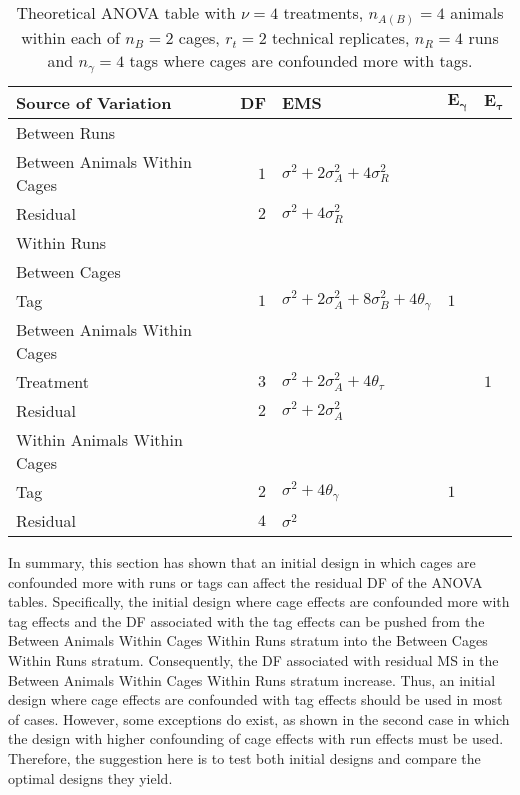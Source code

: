 \begin{table}[ht]
	\caption{Theoretical ANOVA table with $\nu = 4$ treatments, $n_{A(B)} = 4$ animals within each of $n_B = 2$ cages, $r_t = 2$ technical replicates, $n_R = 4$ runs and $n_\gamma = 4$ tags where cages are confounded more with tags.}
	\begin{tabular}[t]{lrlll}
		\toprule
		\multicolumn{1}{l}{\textbf{Source of Variation}} & \multicolumn{1}{l}{\textbf{DF}} & \multicolumn{1}{l}{\textbf{EMS}}& \multicolumn{1}{l}{$\bm{E_{\gamma}}$}&\multicolumn{1}{l}{$\bm{E_{\tau}}$}\\
		\midrule
		Between Runs &  &  & & \\
		\quad Between Animals Within Cages & $1$ & $\sigma^2+2\sigma_{A}^2+4\sigma_{R}^2$ & & \\ 
		\quad Residual & $2$ & $\sigma^2+4\sigma_{R}^2$ & & \\ \hline
		Within Runs &  &  & & \\ 
		\quad Between Cages &  &  & & \\
		\quad \quad Tag & $1$ & $\sigma^2+2\sigma_{A}^2+8\sigma_{B}^2+4\theta_{\gamma}$ &$1$ & \\ \hline
		\quad Between Animals Within Cages &  &  & & \\
		\quad \quad Treatment & $3$ & $\sigma^2+2\sigma_{A}^2+4\theta_{\tau}$ & & $1$\\
		\quad \quad Residual & $2$ & $\sigma^2+2\sigma_{A}^2$ & & \\ \hline
		\quad Within Animals Within Cages &  &  & & \\
		\quad \quad Tag & $2$ & $\sigma^2+4\theta_{\gamma}$ &$1$ & \\
		\quad \quad Residual & $4$ & $\sigma^2$ & & \\
		\bottomrule
	\end{tabular}
	\label{tab:Phase2ANOVA14}
\end{table}

In summary, this section has shown that an initial design in which cages are confounded more with runs or tags can affect the residual DF of the ANOVA tables. Specifically, the initial design where cage effects are confounded more with tag effects and the DF associated with the tag effects can be pushed from the Between Animals Within Cages Within Runs stratum into the Between Cages Within Runs stratum. Consequently, the DF associated with residual MS in the Between Animals Within Cages Within Runs stratum increase. Thus, an initial design where cage effects are confounded with tag effects should be used in most of cases. However, some exceptions do exist, as shown in the second case in which the design with higher confounding of cage effects with run effects must be used. Therefore, the suggestion here is to test both initial designs and compare the optimal designs they yield. 

